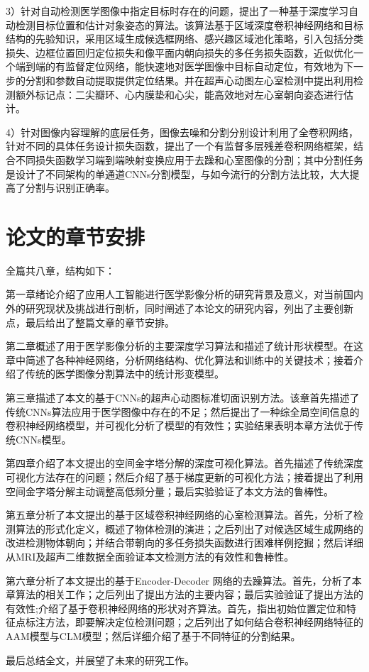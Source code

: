 3）针对自动检测医学图像中指定目标时存在的问题，提出了一种基于深度学习自动检测目标位置和估计对象姿态的算法。该算法基于区域深度卷积神经网络和目标结构的先验知识，采用区域生成候选框网络、感兴趣区域池化策略，引入包括分类损失、边框位置回归定位损失和像平面内朝向损失的多任务损失函数，近似优化一个端到端的有监督定位网络，能快速地对医学图像中目标自动定位，有效地为下一步的分割和参数自动提取提供定位结果。并在超声心动图左心室检测中提出利用检测额外标记点：二尖瓣环、心内膜垫和心尖，能高效地对左心室朝向姿态进行估计。

4）针对图像内容理解的底层任务，图像去噪和分割分别设计利用了全卷积网络，针对不同的具体任务设计损失函数，提出了一个有监督多层残差卷积网络框架，结合不同损失函数学习端到端映射变换应用于去躁和心室图像的分割；其中分割任务是设计了不同架构的单通道CNNs分割模型，与如今流行的分割方法比较，大大提高了分割与识别正确率。


\section{论文的章节安排}

全篇共八章，结构如下：

第一章绪论介绍了应用人工智能进行医学影像分析的研究背景及意义，对当前国内外的研究现状及挑战进行剖析，同时阐述了本论文的研究内容，列出了主要创新点，最后给出了整篇文章的章节安排。

第二章概述了用于医学影像分析的主要深度学习算法和描述了统计形状模型。在这章中简述了各种神经网络，分析网络结构、优化算法和训练中的关键技术；接着介绍了传统的医学图像分割算法中的统计形变模型。

第三章描述了本文的基于CNNs的超声心动图标准切面识别方法。该章首先描述了传统CNNs算法应用于医学图像中存在的不足；然后提出了一种综全局空间信息的卷积神经网络模型，并可视化分析了模型的有效性；实验结果表明本章方法优于传统CNNs模型。

第四章介绍了本文提出的空间金字塔分解的深度可视化算法。首先描述了传统深度可视化方法存在的问题；然后介绍了基于梯度更新的可视化方法；接着提出了利用空间金字塔分解主动调整高低频分量；最后实验验证了本文方法的鲁棒性。

第五章分析了本文提出的基于区域卷积神经网络的心室检测算法。首先，分析了检测算法的形式化定义，概述了物体检测的演进；之后列出了对候选区域生成网络的改进检测物体朝向；并结合带朝向的多任务损失函数进行困难样例挖掘；然后详细从MRI及超声二维数据全面验证本文检测方法的有效性和鲁棒性。

第六章分析了本文提出的基于Encoder-Decoder 网络的去躁算法。首先，分析了本章算法的相关工作；之后列出了提出方法的主要内容；最后实验验证了提出方法的有效性;介绍了基于卷积神经网络的形状对齐算法。首先，指出初始位置定位和特征点标注方法，即要解决定位检测问题；之后列出了如何结合卷积神经网络特征的AAM模型与CLM模型；然后详细介绍了基于不同特征的分割结果。

最后总结全文，并展望了未来的研究工作。